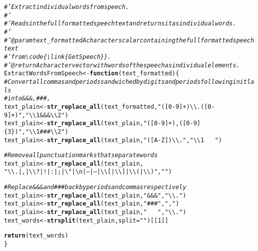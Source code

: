 \documentclass{article}\usepackage[]{graphicx}\usepackage[]{color}
\makeatletter
\newcommand{\hlnum}[1]{\textcolor[rgb]{0.686,0.059,0.569}{#1}}%
\newcommand{\hlstr}[1]{\textcolor[rgb]{0.192,0.494,0.8}{#1}}%
\newcommand{\hlcom}[1]{\textcolor[rgb]{0.678,0.584,0.686}{\textit{#1}}}%
\newcommand{\hlstd}[1]{\textcolor[rgb]{0.345,0.345,0.345}{#1}}%
\newcommand{\hlkwa}[1]{\textcolor[rgb]{0.161,0.373,0.58}{\textbf{#1}}}%
\newcommand{\hlkwb}[1]{\textcolor[rgb]{0.69,0.353,0.396}{#1}}%
\newcommand{\hlkwc}[1]{\textcolor[rgb]{0.333,0.667,0.333}{#1}}%
\newcommand{\hlkwd}[1]{\textcolor[rgb]{0.737,0.353,0.396}{\textbf{#1}}}%
\newenvironment{kframe}{%
 \def\at@end@of@kframe{}%
 \ifinner\ifhmode%
  \def\at@end@of@kframe{\end{minipage}}%
  \begin{minipage}{\columnwidth}%
 \fi\fi%
 \def\FrameCommand##1{\hskip\@totalleftmargin \hskip-\fboxsep
 \colorbox{shadecolor}{##1}\hskip-\fboxsep
     \hskip-\linewidth \hskip-\@totalleftmargin \hskip\columnwidth}%
 \MakeFramed {\advance\hsize-\width
   \@totalleftmargin\z@ \linewidth\hsize
   \@setminipage}}%
 {\par\unskip\endMakeFramed%
 \at@end@of@kframe}
\newenvironment{knitrout}{}{} %
\makeatother
\begin{document}
\begin{knitrout}
\begin{kframe}
\begin{alltt}
\hlcom{#' Extract individual words from speech.}
\hlcom{#' }
\hlcom{#' Reads in the full formatted speech text and returns it as individual words.}
\hlcom{#' }
\hlcom{#' @param text_formatted A character scalar containing the full formatted speech text}
\hlcom{#' from \textbackslash{}code\{\textbackslash{}link\{GetSpeech\}\}.}
\hlcom{#' @return A character vector with words of the speech as individual elements.}
\hlstd{ExtractWordsFromSpeech} \hlkwb{<-} \hlkwa{function}\hlstd{(}\hlkwc{text_formatted}\hlstd{) \{}
  \hlcom{# Convert all commas and periods sandwiched by digits and periods following initlals}
  \hlcom{# into &&&, ###, ~~~}
  \hlstd{text_plain} \hlkwb{<-} \hlkwd{str_replace_all}\hlstd{(text_formatted,} \hlstr{"([0-9]+)\textbackslash{}\textbackslash{}.([0-9]+)"}\hlstd{,} \hlstr{"\textbackslash{}\textbackslash{}1&&&\textbackslash{}\textbackslash{}2"}\hlstd{)}
  \hlstd{text_plain} \hlkwb{<-} \hlkwd{str_replace_all}\hlstd{(text_plain,} \hlstr{"([0-9]+),([0-9]\{3\})"}\hlstd{,} \hlstr{"\textbackslash{}\textbackslash{}1###\textbackslash{}\textbackslash{}2"}\hlstd{)}
  \hlstd{text_plain} \hlkwb{<-} \hlkwd{str_replace_all}\hlstd{(text_plain,} \hlstr{"([A-Z])\textbackslash{}\textbackslash{}."}\hlstd{,} \hlstr{"\textbackslash{}\textbackslash{}1~~~"}\hlstd{)}

  \hlcom{# Remove all punctuation marks that separate words}
  \hlstd{text_plain} \hlkwb{<-} \hlkwd{str_replace_all}\hlstd{(text_plain,}
                                \hlstr{"\textbackslash{}\textbackslash{}.|,|\textbackslash{}\textbackslash{}?|!|:|;|\textbackslash{}"|\textbackslash{}n|—|--|\textbackslash{}\textbackslash{}[|\textbackslash{}\textbackslash{}]|\textbackslash{}\textbackslash{}(|\textbackslash{}\textbackslash{})"}\hlstd{,} \hlstr{""}\hlstd{)}

  \hlcom{# Replace &&& and ### back by periods and commas respectively}
  \hlstd{text_plain} \hlkwb{<-} \hlkwd{str_replace_all}\hlstd{(text_plain,} \hlstr{"&&&"}\hlstd{,} \hlstr{"\textbackslash{}\textbackslash{}."}\hlstd{)}
  \hlstd{text_plain} \hlkwb{<-} \hlkwd{str_replace_all}\hlstd{(text_plain,} \hlstr{"###"}\hlstd{,} \hlstr{","}\hlstd{)}
  \hlstd{text_plain} \hlkwb{<-} \hlkwd{str_replace_all}\hlstd{(text_plain,} \hlstr{"~~~"}\hlstd{,} \hlstr{"\textbackslash{}\textbackslash{}."}\hlstd{)}
  \hlstd{text_words} \hlkwb{<-} \hlkwd{strsplit}\hlstd{(text_plain,} \hlkwc{split} \hlstd{=} \hlstr{" "}\hlstd{)[[}\hlnum{1}\hlstd{]]}

  \hlkwd{return}\hlstd{(text_words)}
\hlstd{\}}


\end{alltt}
\end{kframe}
\end{knitrout}
\end{document}
